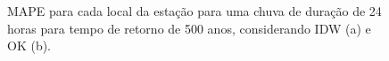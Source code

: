 \documentclass[
]{agujournal2019}
\begin{document}
\begin{figure}

\begin{minipage}{\linewidth}



\end{minipage}%
\newline
\begin{minipage}{\linewidth}



\end{minipage}%

\caption{\label{fig-Figura30}MAPE para cada local da estação para uma
chuva de duração de 24 horas para tempo de retorno de 500 anos,
considerando IDW (a) e OK (b).}

\end{figure}%
\end{document}

